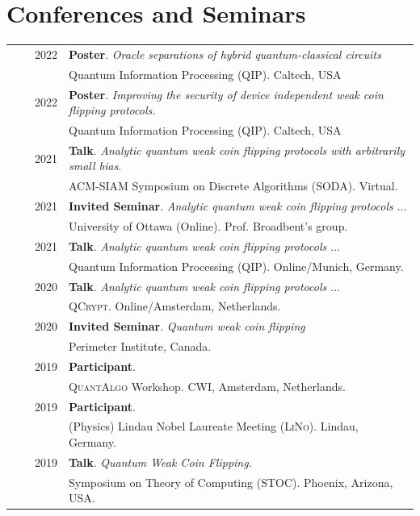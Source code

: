 \documentclass[a4paper,10pt]{article}
\begin{document}
\section{Conferences and Seminars}
\begin{longtable}{rrp{11cm}}
  & ~~2022 &\textbf{Poster}. \emph{Oracle separations of hybrid quantum-classical circuits}\\
  &         &Quantum Information Processing (\textsc{QIP}). Caltech, USA\\
  & ~~2022 &\textbf{Poster}. \emph{Improving the security of device independent weak coin flipping protocols.}\\
  &         &Quantum Information Processing (\textsc{QIP}). Caltech, USA\\  
  & ~~2021 &\textbf{Talk}. \emph{Analytic quantum weak coin flipping protocols with arbitrarily small bias}. \\
  &         &ACM-SIAM Symposium on Discrete Algorithms (\textsc{SODA}). Virtual.\\    
  & ~~2021 &\textbf{Invited Seminar}. \emph{Analytic quantum weak coin flipping protocols  $\dots$} \\  
  &        &University of Ottawa (Online). Prof. Broadbent's group.\\
  & ~~2021 &\textbf{Talk}. \emph{Analytic quantum weak coin flipping protocols $\dots$} \\
  &         &Quantum Information Processing (\textsc{QIP}). Online/Munich, Germany.\\  
  & ~~2020 &\textbf{Talk}. \emph{Analytic quantum weak coin flipping protocols $\dots$} \\
  &         &\textsc{QCrypt}. Online/Amsterdam, Netherlands.\\
  & ~2020 &\textbf{Invited Seminar}. \emph{Quantum weak coin flipping} \\
  &         &Perimeter Institute, Canada.\\
  & ~~2019  &\textbf{Participant}. \\
  & ~~~~~~ &\textsc{QuantAlgo} Workshop. CWI, Amsterdam, Netherlands.\\
  & ~~2019 &\textbf{Participant}. \\
  & ~~~~~~ &(Physics) Lindau Nobel Laureate Meeting (\textsc{LiNo}). Lindau, Germany. \\
  & ~~2019 &\textbf{Talk}. \emph{Quantum Weak Coin Flipping}. \\
  & ~~~~~~ &Symposium on Theory of Computing (\textsc{STOC}). Phoenix, Arizona, USA. \\

\end{longtable}
\end{document}
